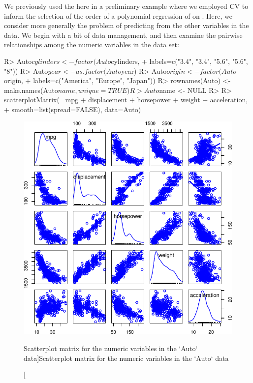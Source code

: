 \documentclass[
]{jss}
\begin{document}
We previously used the  here in a preliminary example where
we employed CV to inform the selection of the order of a polynomial
regression of  on . Here, we consider more
generally the problem of predicting  from the other variables
in the  data. We begin with a bit of data management, and
then examine the pairwise relationships among the numeric variables in
the data set:

\begin{CodeChunk}
\begin{CodeInput}
R> Auto$cylinders <- factor(Auto$cylinders,
+                          labels=c("3.4", "3.4", "5.6", "5.6", "8"))
R> Auto$year <- as.factor(Auto$year)
R> Auto$origin <- factor(Auto$origin,
+                       labels=c("America", "Europe", "Japan"))
R> rownames(Auto) <- make.names(Auto$name, unique=TRUE)
R> Auto$name <- NULL
R> 
R> scatterplotMatrix(~ mpg + displacement + horsepower + weight + acceleration, 
+                   smooth=list(spread=FALSE), data=Auto)
\end{CodeInput}
\begin{figure}

{\centering \includegraphics[width=0.6\linewidth]{JSS-article-reduced_files/figure-latex/Auto-explore-1} 

}

\caption[Scatterplot matrix for the numeric variables in the `Auto` data]{Scatterplot matrix for the numeric variables in the `Auto` data}\label{fig:Auto-explore}
\end{figure}
\end{CodeChunk}
\end{document}
